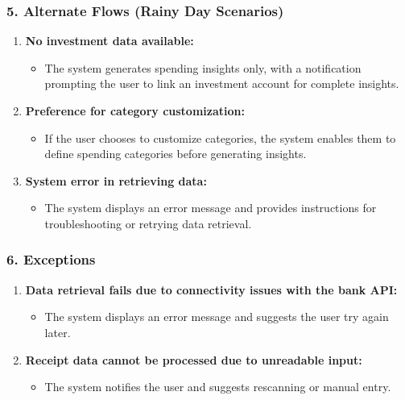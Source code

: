 \subsubsection*{5. Alternate Flows (Rainy Day Scenarios)}
\begin{enumerate}[label=5.\arabic*]
    \item \textbf{No investment data available:}
    \begin{itemize}
        \item The system generates spending insights only, with a notification prompting the user to link an investment account for complete insights.
    \end{itemize}
    \item \textbf{Preference for category customization:}
    \begin{itemize}
        \item If the user chooses to customize categories, the system enables them to define spending categories before generating insights.
    \end{itemize}
    \item \textbf{System error in retrieving data:}
    \begin{itemize}
        \item The system displays an error message and provides instructions for troubleshooting or retrying data retrieval.
    \end{itemize}
\end{enumerate}

\subsubsection*{6. Exceptions}
\begin{enumerate}[label=6.\arabic*]
    \item \textbf{Data retrieval fails due to connectivity issues with the bank API:}
    \begin{itemize}
        \item The system displays an error message and suggests the user try again later.
    \end{itemize}
    \item \textbf{Receipt data cannot be processed due to unreadable input:}
    \begin{itemize}
        \item The system notifies the user and suggests rescanning or manual entry.
    \end{itemize}
\end{enumerate}

